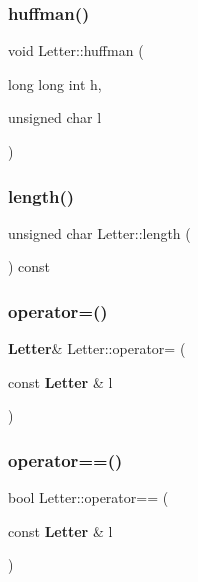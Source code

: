 \subsubsection{huffman()\hspace{0.1cm}{\footnotesize\ttfamily [2/2]}}
{\footnotesize\ttfamily void Letter\+::huffman (\begin{DoxyParamCaption}\item[{long long int}]{h,  }\item[{unsigned char}]{l }\end{DoxyParamCaption})\hspace{0.3cm}{\ttfamily [inline]}}

\mbox{\label{class_letter_a06c63721ba0b1c40ac7591835f2e6e43}} 
\subsubsection{length()}
{\footnotesize\ttfamily unsigned char Letter\+::length (\begin{DoxyParamCaption}{ }\end{DoxyParamCaption}) const\hspace{0.3cm}{\ttfamily [inline]}}

\mbox{\label{class_letter_a5bd34c7d6753f3a950cb3a3358945c1a}} 
\subsubsection{operator=()}
{\footnotesize\ttfamily \textbf{ Letter}\& Letter\+::operator= (\begin{DoxyParamCaption}\item[{const \textbf{ Letter} \&}]{l }\end{DoxyParamCaption})\hspace{0.3cm}{\ttfamily [inline]}}

\mbox{\label{class_letter_acadabf182742d730bcc61f052b29aad8}} 
\subsubsection{operator==()}
{\footnotesize\ttfamily bool Letter\+::operator== (\begin{DoxyParamCaption}\item[{const \textbf{ Letter} \&}]{l }\end{DoxyParamCaption})\hspace{0.3cm}{\ttfamily [inline]}}

